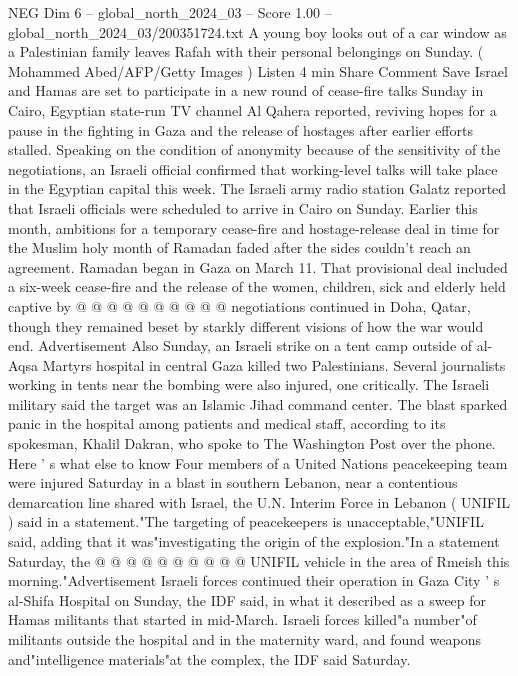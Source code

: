 \begin{textsample}{NEG Dim 6 – global\_north\_2024\_03 – Score 1.00 – global\_north\_2024\_03/200351724.txt}  \label{ex:f6_neg_403}
A young boy looks out of a car window as a Palestinian family leaves Rafah with their personal belongings on Sunday. ( Mohammed Abed/AFP/Getty Images ) Listen 4 min Share Comment Save Israel and Hamas are set to participate in a new round of cease-fire talks Sunday in Cairo, Egyptian state-run TV channel Al Qahera reported, reviving hopes for a pause in the fighting in Gaza and the release of hostages after earlier efforts stalled.
Speaking on the condition of anonymity because of the sensitivity of the negotiations, an Israeli official confirmed that working-level talks will take place in the Egyptian capital this week.
The Israeli army radio station Galatz reported that Israeli officials were scheduled to arrive in Cairo on Sunday.
Earlier this month, ambitions for a temporary cease-fire and hostage-release deal in time for the Muslim holy month of Ramadan faded after the sides couldn't reach an agreement.
Ramadan began in Gaza on March 11.
That provisional deal included a six-week cease-fire and the release of the women, children, sick and elderly held captive by @ @ @ @ @ @ @ @ @ @ negotiations continued in Doha, Qatar, though they remained beset by starkly different visions of how the war would end.
Advertisement Also Sunday, an Israeli strike on a tent camp outside of al-Aqsa Martyrs hospital in central Gaza killed two Palestinians.
Several journalists working in tents near the bombing were also injured, one critically.
The Israeli military said the target was an Islamic Jihad command center.
The blast sparked panic in the hospital among patients and medical staff, according to its spokesman, Khalil Dakran, who spoke to The Washington Post over the phone.
Here ' s what else to know Four members of a United Nations peacekeeping team were injured Saturday in a blast in southern Lebanon, near a contentious demarcation line shared with Israel, the U.N.
Interim Force in Lebanon ( UNIFIL ) said in a statement."The targeting of peacekeepers is unacceptable,"UNIFIL said, adding that it was"investigating the origin of the explosion."In a statement Saturday, the @ @ @ @ @ @ @ @ @ @ UNIFIL vehicle in the area of Rmeish this morning."Advertisement Israeli forces continued their operation in Gaza City ' s al-Shifa Hospital on Sunday, the IDF said, in what it described as a sweep for Hamas militants that started in mid-March.
Israeli forces killed"a number"of militants outside the hospital and in the maternity ward, and found weapons and"intelligence materials"at the complex, the IDF said Saturday.

\end{textsample}
